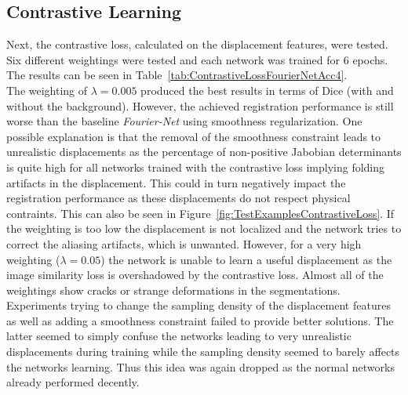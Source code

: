 \documentclass[english,version-2022-01]{uzl-thesis} %
\begin{document}
\subsection{Contrastive Learning} \label{SubSec:ContrastiveLearningResults}
Next, the contrastive loss, calculated on the displacement features, were tested. Six different weightings were tested and each network was trained for 6 epochs. The results can be seen in Table~\ref{tab:ContrastiveLossFourierNetAcc4}. \\
The weighting of $\lambda=0.005$ produced the best results in terms of Dice (with and without the background). However, the achieved registration performance is still worse than the baseline \emph{Fourier-Net} using smoothness regularization. One possible explanation is that the removal of the smoothness constraint leads to unrealistic displacements as the percentage of non-positive Jabobian determinants is quite high for all networks trained with the contrastive loss implying folding artifacts in the displacement. This could in turn negatively impact the registration performance as these displacements do not respect physical contraints. This can also be seen in Figure~\ref{fig:TestExamplesContrastiveLoss}. If the weighting is too low the displacement is not localized and the network tries to correct the aliasing artifacts, which is unwanted. However, for a very high weighting ($\lambda = 0.05$) the network is unable to learn a useful displacement as the image similarity loss is overshadowed by the contrastive loss. Almost all of the weightings show cracks or strange deformations in the segmentations.\\
Experiments trying to change the sampling density of the displacement features as well as adding a smoothness constraint failed to provide better solutions. The latter seemed to simply confuse the networks leading to very unrealistic displacements during training while the sampling density seemed to barely affects the networks learning. Thus this idea was again dropped as the normal networks already performed decently.
\end{document}
